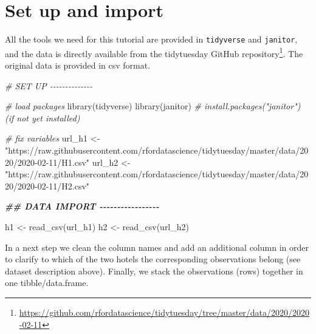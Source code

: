 \documentclass[
  12pt,
]{style/krantz}
\newenvironment{Shaded}{\begin{snugshade}}{\end{snugshade}}
\newcommand{\CommentTok}[1]{\textcolor[rgb]{0.56,0.35,0.01}{\textit{#1}}}
\newcommand{\DocumentationTok}[1]{\textcolor[rgb]{0.56,0.35,0.01}{\textbf{\textit{#1}}}}
\newcommand{\FunctionTok}[1]{\textcolor[rgb]{0.00,0.00,0.00}{#1}}
\newcommand{\NormalTok}[1]{#1}
\newcommand{\OtherTok}[1]{\textcolor[rgb]{0.56,0.35,0.01}{#1}}
\newcommand{\StringTok}[1]{\textcolor[rgb]{0.31,0.60,0.02}{#1}}
\renewcommand{\href}[2]{#2\footnote{\url{#1}}}
\begin{document}
\hypertarget{set-up-and-import}{%
\section{Set up and import}\label{set-up-and-import}}

All the tools we need for this tutorial are provided in \texttt{tidyverse} and \texttt{janitor}, and the data is directly available from the \href{https://github.com/rfordatascience/tidytuesday/tree/master/data/2020/2020-02-11}{tidytuesday GitHub repository}. The original data is provided in csv format.

\begin{Shaded}
\begin{Highlighting}[]
\CommentTok{\# SET UP {-}{-}{-}{-}{-}{-}{-}{-}{-}{-}{-}{-}{-}{-}}

\CommentTok{\# load packages}
\FunctionTok{library}\NormalTok{(tidyverse)}
\FunctionTok{library}\NormalTok{(janitor) }\CommentTok{\# install.packages("janitor") (if not yet installed)}

\CommentTok{\# fix variables}
\NormalTok{url\_h1 }\OtherTok{\textless{}{-}} \StringTok{"https://raw.githubusercontent.com/rfordatascience/tidytuesday/master/data/2020/2020{-}02{-}11/H1.csv"}
\NormalTok{url\_h2 }\OtherTok{\textless{}{-}} \StringTok{"https://raw.githubusercontent.com/rfordatascience/tidytuesday/master/data/2020/2020{-}02{-}11/H2.csv"}

\DocumentationTok{\#\# DATA IMPORT {-}{-}{-}{-}{-}{-}{-}{-}{-}{-}{-}{-}{-}{-}{-}{-}{-}}

\NormalTok{h1 }\OtherTok{\textless{}{-}} \FunctionTok{read\_csv}\NormalTok{(url\_h1)}
\NormalTok{h2 }\OtherTok{\textless{}{-}} \FunctionTok{read\_csv}\NormalTok{(url\_h2)}
\end{Highlighting}
\end{Shaded}

In a next step we clean the column names and add an additional column in order to clarify to which of the two hotels the corresponding observations belong (see dataset description above). Finally, we stack the observations (rows) together in one tibble/data.frame.
\end{document}
